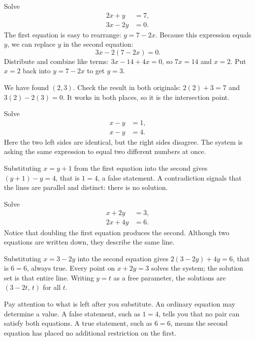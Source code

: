 \documentclass[12pt]{book}
\begin{document}
\begin{example}
Solve
\[
\begin{aligned}
2x+y&=7,\\
3x-2y&=0.
\end{aligned}
\]
The first equation is easy to rearrange: $y=7-2x$. Because this
expression equals $y$, we can replace $y$ in the second equation:
\[
3x-2(7-2x)=0.
\]
Distribute and combine like terms: $3x-14+4x=0$, so $7x=14$ and
$x=2$. Put $x=2$ back into $y=7-2x$ to get $y=3$.

We have found $(2,3)$. Check the result in both originals:
$2(2)+3=7$ and $3(2)-2(3)=0$. It works in both places, so it is
the intersection point.
\end{example}

\begin{example}
Solve
\[
\begin{aligned}
x-y&=1,\\
x-y&=4.
\end{aligned}
\]
Here the two left sides are identical, but the right sides disagree. The system is
asking the same expression to equal two different numbers at once.

Substituting $x=y+1$ from the first equation into the second gives $(y+1)-y=4$, that
is $1=4$, a false statement. A contradiction signals that the lines are parallel and
distinct: there is no solution.
\end{example}

\begin{example}
Solve
\[
\begin{aligned}
x+2y&=3,\\
2x+4y&=6.
\end{aligned}
\]
Notice that doubling the first equation produces the second. Although
two equations are written down, they describe the same line.

Substituting $x=3-2y$ into the second equation gives $2(3-2y)+4y=6$, that is $6=6$,
always true. Every point on $x+2y=3$ solves the system; the solution set is that
entire line. Writing $y=t$ as a free parameter, the solutions are $(3-2t,\,t)$ for
all $t$.
\end{example}

\begin{keyidea}
Pay attention to what is left after you substitute. An ordinary equation
may determine a value. A false statement, such as $1=4$, tells you that no
pair can satisfy both equations. A true statement, such as $6=6$, means
the second equation has placed no additional restriction on the first.
\end{keyidea}
\end{document}
